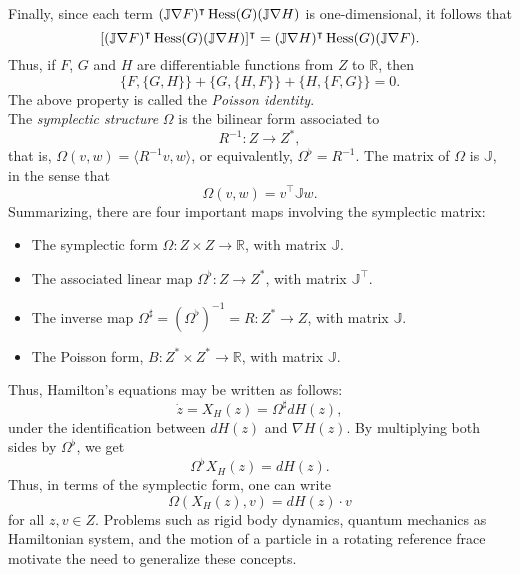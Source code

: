 Finally, since each term $(\mathbb J\nabla F)^\intercal \operatorname{Hess}(G)(\mathbb J\nabla H)$ is one-dimensional, it follows that
$$
[(\mathbb J\nabla F)^\intercal \operatorname{Hess}(G)(\mathbb J\nabla H)]^\intercal=(\mathbb J\nabla H)^\intercal \operatorname{Hess}(G)(\mathbb J\nabla F).
$$
Thus, if $F$, $G$ and $H$ are differentiable functions from $Z$ to $\mathbb R$, then
$$
\{F,\{G,H\}\}+\{G,\{H,F\}\}+\{H,\{F,G\}\}=0.
$$
The above property is called the \emph{Poisson identity}.\\

\noindent The \emph{symplectic structure} $\Omega$ is the bilinear form associated to
$$
R^{-1}: Z\to Z^\ast,
$$
that is, $\Omega(v, w)=\langle R^{-1}v,w\rangle$, or equivalently, $\Omega^\flat=R^{-1}$. The matrix of $\Omega$ is $\mathbb J$, in the sense that
$$
\Omega(v,w)=v^\intercal \mathbb Jw.
$$
Summarizing, there are four important maps involving the symplectic matrix:
\begin{itemize}
\item The symplectic form $\Omega: Z\times Z\to \mathbb R$, with matrix $\mathbb J$.
\item The associated linear map $\Omega^\flat: Z\to Z^\ast$, with matrix $\mathbb J^\intercal$.
\item The inverse map $\Omega^\sharp=(\Omega^\flat)^{-1}=R: Z^\ast\to Z$, with matrix $\mathbb J$.
\item The Poisson form, $B:Z^\ast\times Z^\ast\to \mathbb R$, with matrix $\mathbb J$.
\end{itemize}
Thus, Hamilton's equations may be written as follows:
$$
\dot z=X_H(z)=\Omega^\sharp dH(z),
$$
under the identification between $dH(z)$ and $\nabla H(z)$. By multiplying both sides by $\Omega^\flat$, we get
$$
\Omega^\flat X_H(z)=dH(z).
$$
Thus, in terms of the symplectic form, one can write
$$
\Omega(X_H(z), v)=dH(z)\cdot v
$$
for all $z, v\in Z$. Problems such as rigid body dynamics, quantum mechanics as Hamiltonian system, and the motion of a particle in a rotating reference frace motivate the need to generalize these concepts.

































